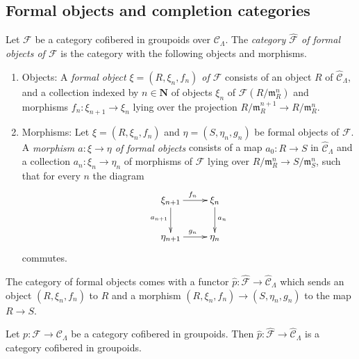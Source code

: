 \subsection{Formal objects and completion categories}
\label{subsection-formal-objects}

\begin{definition}
\label{definition-formal-objects}
Let $\mathcal F$ be a category cofibered in groupoids over
$\mathcal C_{\Lambda}$. The {\it category $\widehat{\mathcal F}$ of formal
objects of  $\mathcal F$} is the category with the following objects and
morphisms.
\begin{enumerate}
\item Objects: A {\it formal object $\xi = (R, \xi_n, f_n)$ of $\mathcal F$} 
consists of an object $R$ of $\widehat{\mathcal C}_{\Lambda}$, and a collection 
indexed by $n \in \mathbf{N}$ of objects $\xi_{n}$ of $\mathcal 
F(R/\mathfrak{m}_R^{n})$ and morphisms $f_{n}: \xi_{n+1} \rightarrow \xi_{n}$ 
lying over the projection $R/\mathfrak{m}_R^{n+1} \rightarrow 
R/\mathfrak{m}_R^{n}$.
\item Morphisms: Let $\xi = (R,\xi_n,f_n)$ and $\eta = (S,\eta_n,g_n)$ be 
formal objects of $\mathcal F$.  A {\it morphism $a: \xi \rightarrow \eta$ of 
formal objects} consists of a map $a_0: R \rightarrow S$ in $\widehat{\mathcal 
C}_{\Lambda}$ and a collection $a_n: \xi_n \rightarrow \eta_n$ of morphisms of 
$\mathcal F$ lying over $R/\mathfrak{m}_R^n \rightarrow S/\mathfrak{m}_S^n$, 
such that for every $n$ the diagram
\[
\xymatrix{
\xi_{n+1} \ar[r]^{f_{n}} \ar[d]_{a_{n+1}} & \xi_{n} \ar[d]^{a_{n}} \\
\eta_{n+1} \ar[r]^{g_{n}} & \eta_{n} 
}
\]
commutes.
\end{enumerate}
\end{definition}

\noindent
The category of formal objects comes with a functor $\widehat{p}: 
\widehat{\mathcal F} \rightarrow \widehat{\mathcal C}_{\Lambda}$ which sends an 
object $(R,\xi_n,f_n)$ to $R$ and a morphism $(R,\xi_n,f_n) \rightarrow 
(S,\eta_n,g_n)$ to the map $R \rightarrow S$.

\begin{lemma}
\label{lemma-completion-cofibred}
Let $p: \mathcal F \rightarrow \mathcal C_{\Lambda}$ be a category cofibered in 
groupoids.  Then $\widehat{p}: \widehat{\mathcal F} \rightarrow 
\widehat{\mathcal C}_{\Lambda}$ is a category cofibered in groupoids.
\end{lemma}

